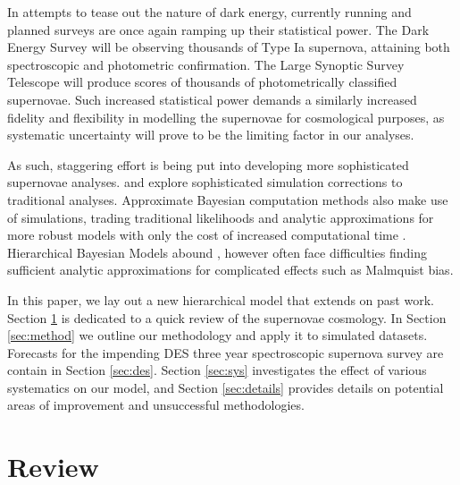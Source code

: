 \documentclass[a4paper,fleqn,usenatbib]{mnras}
\begin{document}
In attempts to tease out the nature of dark energy, currently running and planned surveys are once again ramping up their statistical power. The Dark Energy Survey \citep[DES,][]{Bernstein2012, Abbott2016} will be observing thousands of Type Ia supernova, attaining both spectroscopic and photometric confirmation. The Large Synoptic Survey Telescope \citep[LSST,][]{Ivezic2008, LSSTScienceCollaboration2009} will produce scores of thousands of photometrically classified supernovae. Such increased statistical power demands a similarly increased fidelity and flexibility in modelling the supernovae for cosmological purposes, as systematic uncertainty will prove to be the limiting factor in our analyses.

As such, staggering effort is being put into developing more sophisticated supernovae analyses. \citet{Scolnic2016} and \citet{Kessler2017} explore sophisticated simulation corrections to traditional analyses. Approximate Bayesian computation methods also make use of simulations, trading traditional likelihoods and analytic approximations for more robust models with only the cost of increased computational time \citep{Weyant2013, Jennings2016}. Hierarchical Bayesian Models abound \citep{Mandel2009, March2011, March2014a, Rubin2015, Shariff2016, Roberts2017}, however often face difficulties finding sufficient analytic approximations for complicated effects such as Malmquist bias.


In this paper, we lay out a new hierarchical model that extends on past work. Section \ref{sec:review} is dedicated to a quick review of the supernovae cosmology. In Section \ref{sec:method} we outline our methodology and apply it to simulated datasets. Forecasts for the impending DES three year spectroscopic supernova survey are contain in Section \ref{sec:des}. Section \ref{sec:sys} investigates the effect of various systematics on our model, and Section \ref{sec:details} provides details on potential areas of improvement and unsuccessful methodologies.








\section{Review}
\label{sec:review}
\end{document}

